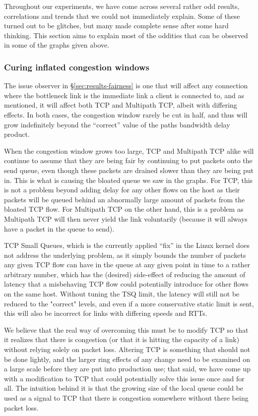Throughout our experiments, we have come across several rather odd results,
correlations and trends that we could not immediately explain. Some of these
turned out to be glitches, but many made complete sense after some hard
thinking. This section aims to explain most of the oddities that can be observed
in some of the graphs given above.

\subsubsection{Curing inflated congestion windows}
The issue observer in \S\ref{sec:results-fairness} is one that will affect any
connection where the bottleneck link is the immediate link a client is connected
to, and as mentioned, it will affect both TCP and Multipath TCP, albeit with
differing effects. In both cases, the congestion window rarely be cut in half,
and thus will grow indefinitely beyond the ``correct'' value of the paths
bandwidth delay product.

When the congestion window grows too large, TCP and Multipath TCP alike will
continue to assume that they are being fair by continuing to put packets onto
the send queue, even though these packets are drained slower than they are being
put in. This is what is causing the bloated queue we saw in the graphs. For TCP,
this is not a problem beyond adding delay for any other flows on the host as
their packets will be queued behind an abnormally large amount of packets from
the bloated TCP flow. For Multipath TCP on the other hand, this is a problem as
Multipath TCP will then never yield the link voluntarily (because it will always
have a packet in the queue to send).

TCP Small Queues, which is the currently applied ``fix'' in the Linux kernel
does not address the underlying problem, as it simply bounds the number of
packets any given TCP flow can have in the queue at any given point in time to a
rather arbitrary number, which has the (desired) side-effect of reducing the
amount of latency that a misbehaving TCP flow could potentially introduce for
other flows on the same host. Without tuning the TSQ limit, the latency will
still not be reduced to the "correct" levels, and even if a more conservative
static limit is sent, this will also be incorrect for links with differing
speeds and RTTs.

We believe that the real way of overcoming this must be to modify TCP so that it
realizes that there is congestion (or that it is hitting the capacity of a link)
without relying solely on packet loss. Altering TCP is something that should not
be done lightly, and the larger ring effects of any change need to be examined
on a large scale before they are put into production use; that said, we have
come up with a modification to TCP that could potentially solve this issue once
and for all. The intuition behind it is that the growing size of the local queue
could be used as a signal to TCP that there is congestion somewhere without
there being packet loss.

